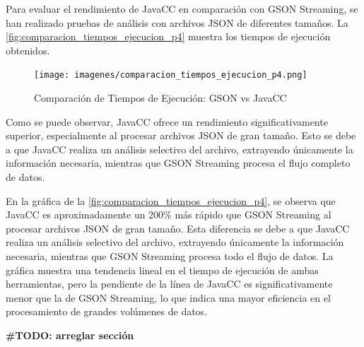 

Para evaluar el rendimiento de JavaCC en comparación con GSON Streaming, se han realizado pruebas de análisis con archivos JSON de diferentes tamaños. La \autoref{fig:comparacion_tiempos_ejecucion_p4} muestra los tiempos de ejecución obtenidos.



\begin{figure}[H]
	\centering
	\texttt{[image: imagenes/comparacion\_tiempos\_ejecucion\_p4.png]}
	\caption{\label{fig:comparacion_tiempos_ejecucion_p4}Comparación de Tiempos de Ejecución: GSON vs JavaCC}
\end{figure}

 Como se puede observar, JavaCC ofrece un rendimiento significativamente superior, especialmente al procesar archivos JSON de gran tamaño. Esto se debe a que JavaCC realiza un análisis selectivo del archivo, extrayendo únicamente la información necesaria, mientras que GSON Streaming procesa el flujo completo de datos. 
 

 En la gráfica de la \autoref{fig:comparacion_tiempos_ejecucion_p4}, se observa que JavaCC es aproximadamente un 200\% más rápido que GSON Streaming al procesar archivos JSON de gran tamaño. Esta diferencia se debe a que JavaCC realiza un análisis selectivo del archivo, extrayendo únicamente la información necesaria, mientras que GSON Streaming procesa todo el flujo de datos. La gráfica muestra una tendencia lineal en el tiempo de ejecución de ambas herramientas, pero la pendiente de la línea de JavaCC es significativamente menor que la de GSON Streaming, lo que indica una mayor eficiencia en el procesamiento de grandes volúmenes de datos.

 \textbf{\#TODO: arreglar sección}


